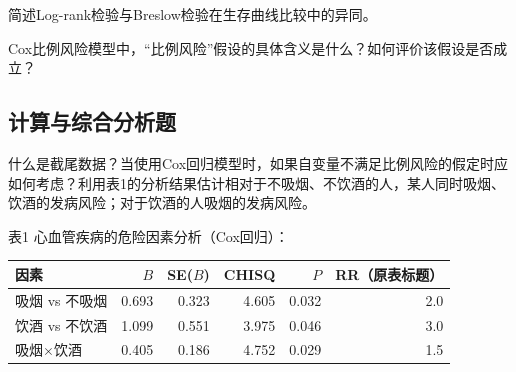 \par\addvspace{8pt}\noindent\begin{minipage}{\linewidth}


简述Log-rank检验与Breslow检验在生存曲线比较中的异同。



\end{minipage}\par\vspace{5pt}

\par\addvspace{8pt}\noindent\begin{minipage}{\linewidth}


Cox比例风险模型中，``比例风险''假设的具体含义是什么？如何评价该假设是否成立？



\end{minipage}\par\vspace{5pt}

\par\addvspace{8pt}\noindent\begin{minipage}{\linewidth}

\subsection{计算与综合分析题}


什么是截尾数据？当使用Cox回归模型时，如果自变量不满足比例风险的假定时应如何考虑？利用表1的分析结果估计相对于不吸烟、不饮酒的人，某人同时吸烟、饮酒的发病风险；对于饮酒的人吸烟的发病风险。

表1 心血管疾病的危险因素分析（Cox回归）：

\begin{center}\small\setlength{\tabcolsep}{4pt}\renewcommand{\arraystretch}{1.22}\begin{tabular}{@{}lrrrrr@{}}
\toprule
因素 & \(B\) & SE(\(B\)) & CHISQ & \(P\) & RR（原表标题） \\
\midrule

吸烟 vs 不吸烟 & 0.693 & 0.323 & 4.605 & 0.032 & 2.0 \\
饮酒 vs 不饮酒 & 1.099 & 0.551 & 3.975 & 0.046 & 3.0 \\
吸烟\(\times\)饮酒 & 0.405 & 0.186 & 4.752 & 0.029 & 1.5 \\
\bottomrule\end{tabular}\end{center}



\end{minipage}\par\vspace{5pt}

